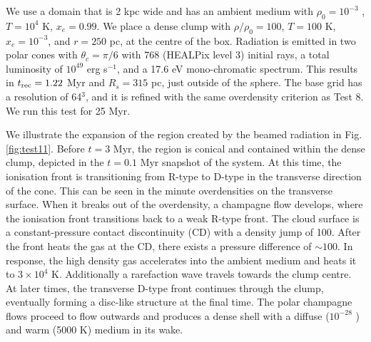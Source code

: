 \documentclass[useAMS,usenatbib]{mn2e}
\begin{document}
We use a domain that is 2 kpc wide and has an ambient medium with
$\rho_0 = 10^{-3}$ \cubecm, $T = 10^4$ K, $x_e = 0.99$.  We place a
dense clump with $\rho/\rho_0 = 100$, $T = 100$ K, $x_e = 10^{-3}$,
and $r = 250$ pc, at the centre of the box.  Radiation is emitted in
two polar cones with $\theta_c = \pi/6$ with 768 (HEALPix level 3)
initial rays, a total luminosity of $10^{49}$ erg s$^{-1}$, and a 17.6
eV mono-chromatic spectrum.  This results in $t_{\rm rec} = 1.22$ Myr
and $R_s = 315$ pc, just outside of the sphere.  The base grid has a
resolution of 64$^3$, and it is refined with the same overdensity
criterion as Test 8.  We run this test for 25 Myr.

We illustrate the expansion of the \hii region created by the
beamed radiation in Fig. \ref{fig:test11}.  Before $t = 3$ Myr, the
\hii region is conical and contained within the dense clump,
depicted in the $t = 0.1$ Myr snapshot of the system.  At this time,
the ionisation front is transitioning from R-type to D-type in the
transverse direction of the cone.  This can be seen in the minute
overdensities on the \hii transverse surface.  When it breaks
out of the overdensity, a champagne flow develops, where the
ionisation front transitions back to a weak R-type front.  The cloud
surface is a constant-pressure contact discontinuity (CD) with a
density jump of 100.  After the front heats the gas at the CD, there
exists a pressure difference of $\sim 100$.  In response, the high
density gas accelerates into the ambient medium and heats it to $3
\times 10^4$ K.  Additionally a rarefaction wave travels towards the
clump centre.  At later times, the transverse D-type front continues
through the clump, eventually forming a disc-like structure at the
final time.  The polar champagne flows proceed to flow outwards and
produces a dense shell with a diffuse ($10^{-28}$ \cubecm) and warm
(5000 K) medium in its wake.

% 
\end{document}

